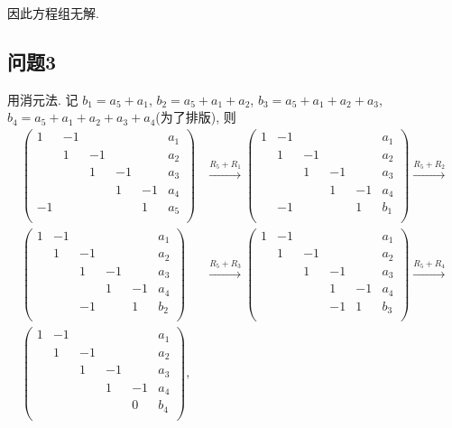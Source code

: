 因此方程组无解.
\newpage
\subsection*{问题3}

用消元法. 记 $b_1 = a_5 + a_1$, $b_2 = a_5 + a_1 + a_2$, $b_3 = a_5 + a_1 + a_2 + a_3$, $b_4 = a_5 + a_1 + a_2 + a_3 + a_4$(为了排版), 则
\[
\begin{aligned}
\left(
\begin{array}{ccccc|c}
    1 & -1 &   &   &   & a_1 \\
      & 1 & -1 &   &   & a_2 \\
      &   & 1 & -1 &   & a_3 \\
      &   &   & 1 & -1 & a_4 \\
    -1 &   &   &   & 1 & a_5 \\
\end{array}
\right)
& \stackrel{R_5 + R_1}{\longrightarrow}
\left(
\begin{array}{ccccc|c}
    1 & -1 &   &   &   & a_1 \\
      & 1 & -1 &   &   & a_2 \\
      &   & 1 & -1 &   & a_3 \\
      &   &   & 1 & -1 & a_4 \\
      & -1 &   &   & 1 & b_1 \\
\end{array}
\right) 
 \stackrel{R_5 + R_2}{\longrightarrow} \\
\left(
\begin{array}{ccccc|c}
    1 & -1 &   &   &   & a_1 \\
      & 1 & -1 &   &   & a_2 \\
      &   & 1 & -1 &   & a_3 \\
      &   &   & 1 & -1 & a_4 \\
      &   & -1  &   & 1 & b_2 \\
\end{array}
\right) 
& \stackrel{R_5 + R_3}{\longrightarrow} 
\left(
\begin{array}{ccccc|c}
    1 & -1 &   &   &   & a_1 \\
      & 1 & -1 &   &   & a_2 \\
      &   & 1 & -1 &   & a_3 \\
      &   &   & 1 & -1 & a_4 \\
      &   &   & -1  & 1 & b_3 \\
\end{array}
\right) 
 \stackrel{R_5 + R_4}{\longrightarrow} \\
\left(
\begin{array}{ccccc|c}
    1 & -1 &   &   &   & a_1 \\
      & 1 & -1 &   &   & a_2 \\
      &   & 1 & -1 &   & a_3 \\
      &   &   & 1 & -1 & a_4 \\
      &   &   &    & 0 & b_4 \\
\end{array}
\right) ,
\end{aligned}
\]

